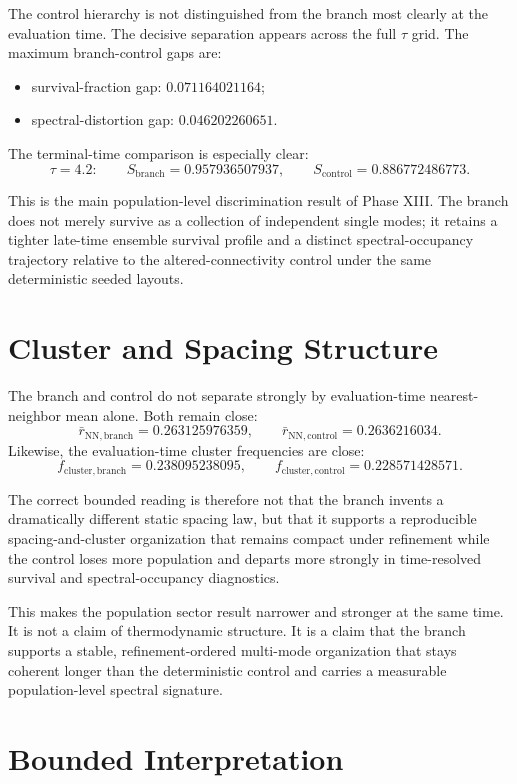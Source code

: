 \documentclass[11pt]{article}
\begin{document}
The control hierarchy is not distinguished from the branch most clearly at the evaluation time. The decisive separation appears across the full $\tau$ grid. The maximum branch-control gaps are:
\begin{itemize}
\item survival-fraction gap: $0.071164021164$;
\item spectral-distortion gap: $0.046202260651$.
\end{itemize}

The terminal-time comparison is especially clear:
\[
\tau = 4.2:
\qquad
S_{\mathrm{branch}} = 0.957936507937,
\qquad
S_{\mathrm{control}} = 0.886772486773.
\]

This is the main population-level discrimination result of Phase XIII. The branch does not merely survive as a collection of independent single modes; it retains a tighter late-time ensemble survival profile and a distinct spectral-occupancy trajectory relative to the altered-connectivity control under the same deterministic seeded layouts.

\section{Cluster and Spacing Structure}

The branch and control do not separate strongly by evaluation-time nearest-neighbor mean alone. Both remain close:
\[
\bar{r}_{\mathrm{NN,branch}} = 0.263125976359,
\qquad
\bar{r}_{\mathrm{NN,control}} = 0.2636216034.
\]
Likewise, the evaluation-time cluster frequencies are close:
\[
f_{\mathrm{cluster,branch}} = 0.238095238095,
\qquad
f_{\mathrm{cluster,control}} = 0.228571428571.
\]

The correct bounded reading is therefore not that the branch invents a dramatically different static spacing law, but that it supports a reproducible spacing-and-cluster organization that remains compact under refinement while the control loses more population and departs more strongly in time-resolved survival and spectral-occupancy diagnostics.

This makes the population sector result narrower and stronger at the same time. It is not a claim of thermodynamic structure. It is a claim that the branch supports a stable, refinement-ordered multi-mode organization that stays coherent longer than the deterministic control and carries a measurable population-level spectral signature.

\section{Bounded Interpretation}
\end{document}
